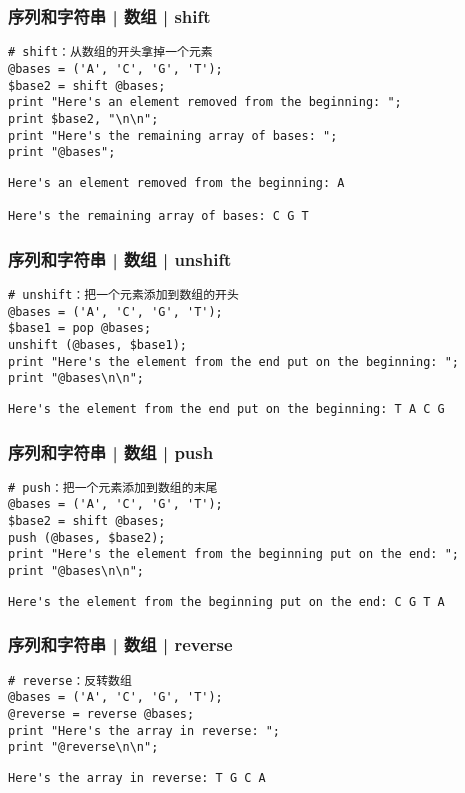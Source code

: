 \begin{frame}[fragile]
  \frametitle{序列和字符串 | 数组 | \alert{shift}}
\begin{lstlisting}
# shift：从数组的开头拿掉一个元素
@bases = ('A', 'C', 'G', 'T');
$base2 = shift @bases;
print "Here's an element removed from the beginning: ";
print $base2, "\n\n";
print "Here's the remaining array of bases: ";
print "@bases";
\end{lstlisting}
\pause
\begin{lstlisting}
Here's an element removed from the beginning: A

Here's the remaining array of bases: C G T
\end{lstlisting}
\end{frame}

\begin{frame}[fragile]
  \frametitle{序列和字符串 | 数组 | \alert{unshift}}
\begin{lstlisting}
# unshift：把一个元素添加到数组的开头
@bases = ('A', 'C', 'G', 'T');
$base1 = pop @bases;
unshift (@bases, $base1);
print "Here's the element from the end put on the beginning: ";
print "@bases\n\n";
\end{lstlisting}
\pause
\begin{lstlisting}
Here's the element from the end put on the beginning: T A C G
\end{lstlisting}
\end{frame}

\begin{frame}[fragile]
  \frametitle{序列和字符串 | 数组 | \alert{push}}
\begin{lstlisting}
# push：把一个元素添加到数组的末尾
@bases = ('A', 'C', 'G', 'T');
$base2 = shift @bases;
push (@bases, $base2);
print "Here's the element from the beginning put on the end: ";
print "@bases\n\n";
\end{lstlisting}
\pause
\begin{lstlisting}
Here's the element from the beginning put on the end: C G T A
\end{lstlisting}
\end{frame}

\begin{frame}[fragile]
  \frametitle{序列和字符串 | 数组 | \alert{reverse}}
\begin{lstlisting}
# reverse：反转数组
@bases = ('A', 'C', 'G', 'T');
@reverse = reverse @bases;
print "Here's the array in reverse: ";
print "@reverse\n\n";
\end{lstlisting}
\pause
\begin{lstlisting}
Here's the array in reverse: T G C A
\end{lstlisting}
\end{frame}

